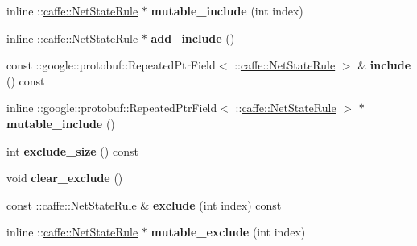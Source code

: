 \begin{DoxyCompactItemize}
\mbox{\label{classcaffe_1_1_v1_layer_parameter_a11195ad9c18fac052d629e4c9dc25619}} 
inline \+::\mbox{\hyperlink{classcaffe_1_1_net_state_rule}{caffe\+::\+Net\+State\+Rule}} $\ast$ {\bfseries mutable\+\_\+include} (int index)
\item 
\mbox{\label{classcaffe_1_1_v1_layer_parameter_ad6d3c3dd6f75ce7067c027d5d482aa38}} 
inline \+::\mbox{\hyperlink{classcaffe_1_1_net_state_rule}{caffe\+::\+Net\+State\+Rule}} $\ast$ {\bfseries add\+\_\+include} ()
\item 
\mbox{\label{classcaffe_1_1_v1_layer_parameter_a31f9dbffb8e9e79ac689fcc4193d12fc}} 
const \+::google\+::protobuf\+::\+Repeated\+Ptr\+Field$<$ \+::\mbox{\hyperlink{classcaffe_1_1_net_state_rule}{caffe\+::\+Net\+State\+Rule}} $>$ \& {\bfseries include} () const
\item 
\mbox{\label{classcaffe_1_1_v1_layer_parameter_a30485630a5c3947106f0f36639a963e8}} 
inline \+::google\+::protobuf\+::\+Repeated\+Ptr\+Field$<$ \+::\mbox{\hyperlink{classcaffe_1_1_net_state_rule}{caffe\+::\+Net\+State\+Rule}} $>$ $\ast$ {\bfseries mutable\+\_\+include} ()
\item 
\mbox{\label{classcaffe_1_1_v1_layer_parameter_ab33c88707ad3518288c15f3f1569e88a}} 
int {\bfseries exclude\+\_\+size} () const
\item 
\mbox{\label{classcaffe_1_1_v1_layer_parameter_ab43037fdeacf8f3903499a91111a5fc7}} 
void {\bfseries clear\+\_\+exclude} ()
\item 
\mbox{\label{classcaffe_1_1_v1_layer_parameter_ae1ff3a1d43daaaf9fff32d02789d9884}} 
const \+::\mbox{\hyperlink{classcaffe_1_1_net_state_rule}{caffe\+::\+Net\+State\+Rule}} \& {\bfseries exclude} (int index) const
\item 
\mbox{\label{classcaffe_1_1_v1_layer_parameter_a542264bbc2928e5b246711711c7767e1}} 
inline \+::\mbox{\hyperlink{classcaffe_1_1_net_state_rule}{caffe\+::\+Net\+State\+Rule}} $\ast$ {\bfseries mutable\+\_\+exclude} (int index)

\end{DoxyCompactItemize}
